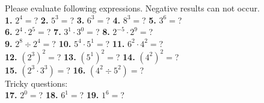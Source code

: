 \documentclass[a4paper]{article}
\begin{document}
\begin{LARGE}

Please evaluate following expressions. Negative results can not occur. \\[0.75cm]

\textbf{1.} $2^4=$? \hspace{0.3cm}
\textbf{2.} $5^3=$? \hspace{0.3cm}
\textbf{3.} $6^3=$? \hspace{0.3cm}
\textbf{4.} $8^3=$? \hspace{0.3cm}
\textbf{5.} $3^6=$? \\[0.1cm]

\textbf{6.} $2^4 \cdot 2^5=$? \hspace{0.3cm}
\textbf{7.} $3^1 \cdot 3^0=$? \hspace{0.3cm}
\textbf{8.} $2^{-5} \cdot 2^9=$? \\[0.1cm]

\textbf{9.} $2^8 \div 2^4=$? \hspace{0.3cm}
\textbf{10.} $5^4 \cdot 5^1=$? \hspace{0.3cm}
\textbf{11.} $6^2 \cdot 4^2=$? \\[0.1cm]

\textbf{12.} $(2^3)^2 =$? \hspace{0.3cm}
\textbf{13.} $(5^1)^2 =$? \hspace{0.3cm}
\textbf{14.} $(4^2)^2=$? \\[0.1cm]

\textbf{15.} $(2^3 \cdot 3^3) =$? \hspace{0.3cm}
\textbf{16.} $(4^2 \div 5^2) =$? \\[0.1cm]

Tricky questions: \\[0.1cm]

\textbf{17.} $2^0=$? \hspace{0.3cm}
\textbf{18.} $6^1=$? \hspace{0.3cm}
\textbf{19.} $1^6=$? \\[0.1cm]

\end{LARGE}
\end{document}
